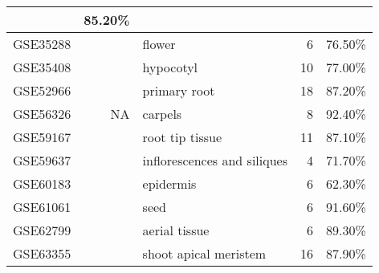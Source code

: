 \documentclass[letterpaper,12pt]{article}
\begin{document}
\begin{table}[!ht]
\begin{tabular}{lrlrr}
			& 85.20\% \\ \hline
		GSE35288 & \cite{niederhuth2013transcriptional} & flower                      & 6  & 76.50\% \\
		GSE35408 & \cite{bai2012brassinosteroid}        & hypocotyl                   & 10 & 77.00\%    \\
		GSE52966 & \cite{chaiwanon2015spatiotemporal}   & primary root                & 18 & 87.20\% \\
		GSE56326 & NA                                     & carpels                     & 8  & 92.40\% \\
		GSE59167 & \cite{pallakies2014cle40}            & root tip tissue             & 11 & 87.10\% \\
		GSE59637 & \cite{mizzotti2014seedstick}         & inflorescences and siliques & 4  & 71.70\% \\
		GSE60183 & \cite{kimura2015flowering}           & epidermis					  & 6  & 62.30\% \\
		GSE61061 & \cite{macgregor2015seed}   	        & seed                        & 6  & 91.60\% \\
		GSE62799 & \cite{groth2014snf2}                 & aerial tissue               & 6  & 89.30\% \\
		GSE63355 & \cite{liu2015repair}                 & shoot apical meristem       & 16 & 87.90\%  \\ \hline
	\end{tabular}
\end{table}



\clearpage
\end{document}
